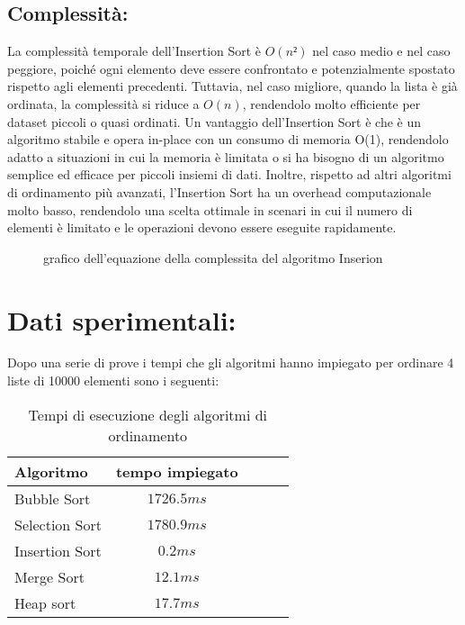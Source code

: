 \documentclass[a4paper]{article}
\begin{document}
\subsection{Complessità:}
La complessità temporale dell’Insertion Sort è \(O(n²)\) nel caso medio e nel caso peggiore, poiché ogni elemento deve essere confrontato e potenzialmente
spostato rispetto agli elementi precedenti. Tuttavia, nel caso migliore, quando la lista è già ordinata, la complessità si riduce a \(O(n)\), rendendolo
molto efficiente per dataset piccoli o quasi ordinati. Un vantaggio dell’Insertion Sort è che è un algoritmo stabile e opera in-place con un consumo 
di memoria O(1), rendendolo adatto a situazioni in cui la memoria è limitata o si ha bisogno di un algoritmo semplice ed efficace per piccoli insiemi 
di dati. Inoltre, rispetto ad altri algoritmi di ordinamento più avanzati, l'Insertion Sort ha un overhead computazionale molto basso, rendendolo una 
scelta ottimale in scenari in cui il numero di elementi è limitato e le operazioni devono essere eseguite rapidamente.
\begin{figure}[h]
    \caption{grafico dell'equazione della complessita del algoritmo Inserion}
\end{figure}
\section{Dati sperimentali:}
Dopo una serie di prove i tempi che gli algoritmi hanno impiegato per ordinare 4 liste di 10000 elementi sono i seguenti:
\begin{table}[h]
    \centering
    \caption{Tempi di esecuzione degli algoritmi di ordinamento}
    \begin{tabular}{lcccc}
    \toprule
    \textbf{Algoritmo} & \textbf{tempo impiegato} \\
    \midrule
    Bubble Sort & $1726.5 ms $ \\
    Selection Sort & $1780.9 ms$ \\
    Insertion Sort & $0.2 ms$ \\
    Merge Sort & $12.1 ms$ \\
    Heap sort & $17.7 ms$ \\
    \bottomrule
    \end{tabular}
    \label{tab:sorting-algorithms}
\end{table}
\end{document}
